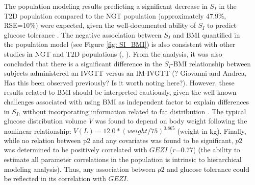 \documentclass[utf8]{frontiersSCNS} %
\begin{document}
The population modeling results predicting a significant decrease in $S_I$ in the T2D population compared to the NGT population (approximately 47.9\%, RSE=10\%) were expected, given the well-documented ability of $S_I$ to predict glucose tolerance \citep{Bergman1997TheTolerance}. The negative association between $S_I$ and BMI quantified in the population model (see Figure \ref{fig: SI_BMI}) is also consistent with other studies in NGT and T2D populations (\citet{welch_1990}, \citet{Morettini_2019}). From the analysis, it was also concluded that there is a significant difference in the $S_I$-BMI relationship between subjects administered an IVGTT versus an IM-IVGTT (? Giovanni and Andrea, Has this been observed previously? Is it worth noting here?). However, these results related to BMI should be interpreted cautiously, given the well-known challenges associated with using BMI as independent factor to explain differences in $S_I$, without incorporating information related to fat distribution \citep{Klein_2007}. The typical glucose distribution volume $V$ was found to depend on body weight following the nonlinear relationship: $V (L)=12.0*(weight/75)^{0.865}$ (weight in kg). Finally, while no relation between p2 and any covariates was found to be significant, $p2$ was determined to be positively correlated with $GEZI$ ($r$=0.77) (the ability to estimate all parameter correlations in the population is intrinsic to hierarchical modeling analysis). Thus, any association between $p2$ and glucose tolerance could be reflected in its correlation with $GEZI$.
\end{document}
